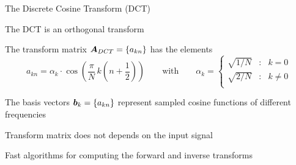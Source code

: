 

\begin{frame}{The Discrete Cosine Transform (DCT)}
  \vspace{-1ex}
  \bit
\item The DCT is an orthogonal transform
\item<+-> The transform matrix ${\boldsymbol{A}}_{DCT}=\{a_{kn}\}$ has the elements
  $$
  a_{kn}=\alpha_{k}\cdot\cos\left(\frac{\pi}{N}\,k\left(n+\frac{1}{2}\right)\right)
  \qquad\text{with}\qquad
  \alpha_k=\left\{\begin{array}{rcl}
  \sqrt{1/N} &:& k=0\\[.5ex]
  \sqrt{2/N} &:& k\neq0\\
  \end{array}\right.
  $$
\item<+-> The basis vectors ${\boldsymbol{b}}_k=\{a_{kn}\}$ represent sampled cosine functions of different frequencies
  \eit

  \onslide<+->
  \medskip
  \bit
\item Transform matrix does not depends on the input signal
\item Fast algorithms for computing the forward and inverse transforms
  \eit
  \onslide
\end{frame}

